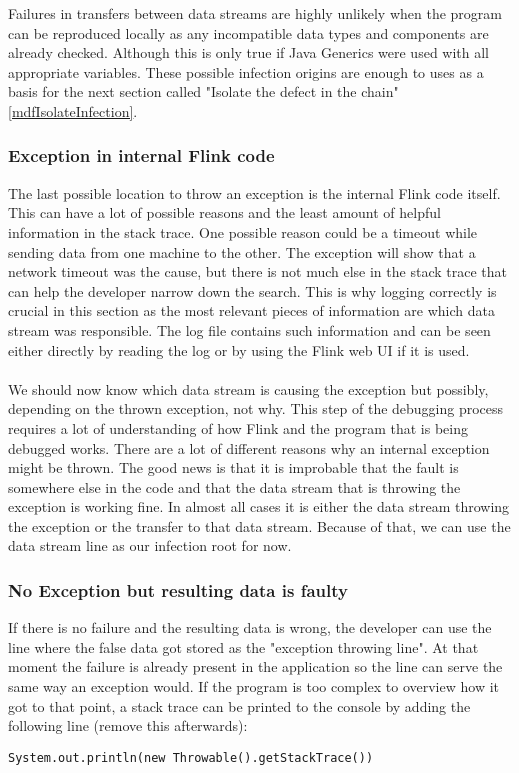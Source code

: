 Failures in transfers between data streams are highly unlikely when the program can be reproduced locally as any incompatible data types and components are already checked. Although this is only true if Java Generics were used with all appropriate variables. These possible infection origins are enough to uses as a basis for the next section called "Isolate the defect in the chain" \ref{mdfIsolateInfection}.

\subsubsection{Exception in internal Flink code}
The last possible location to throw an exception is the internal Flink code itself. This can have a lot of possible reasons and the least amount of helpful information in the stack trace. One possible reason could be a timeout while sending data from one machine to the other. The exception will show that a network timeout was the cause, but there is not much else in the stack trace that can help the developer narrow down the search. This is why logging correctly is crucial in this section as the most relevant pieces of information are which data stream was responsible. The log file contains such information and can be seen either directly by reading the log or by using the Flink web UI if it is used.

\paragraph{} We should now know which data stream is causing the exception but possibly, depending on the thrown exception, not why. This step of the debugging process requires a lot of understanding of how Flink and the program that is being debugged works. There are a lot of different reasons why an internal exception might be thrown. The good news is that it is improbable that the fault is somewhere else in the code and that the data stream that is throwing the exception is working fine. In almost all cases it is either the data stream throwing the exception or the transfer to that data stream. Because of that, we can use the data stream line as our infection root for now.

\subsubsection{No Exception but resulting data is faulty}
If there is no failure and the resulting data is wrong, the developer can use the line where the false data got stored as the "exception throwing line". At that moment the failure is already present in the application so the line can serve the same way an exception would. If the program is too complex to overview how it got to that point, a stack trace can be printed to the console by adding the following line (remove this afterwards):
\begin{lstlisting}[caption={Create Stacktrace}]
 System.out.println(new Throwable().getStackTrace())
\end{lstlisting}


